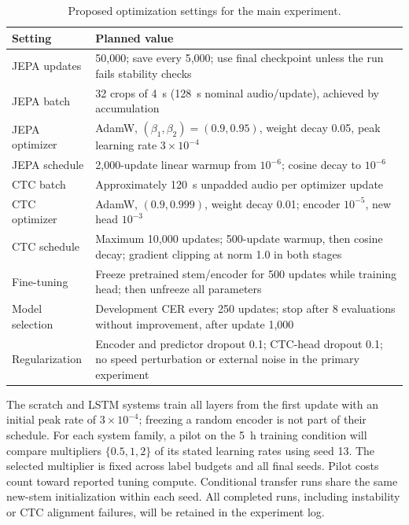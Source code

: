 \begin{table}[t]
\caption{Proposed optimization settings for the main experiment.}
\label{tab:settings}
\centering\footnotesize
\begin{tabularx}{\columnwidth}{@{}p{} X@{}}
\toprule
Setting & Planned value \\
\midrule
JEPA updates & 50,000; save every 5,000; use final checkpoint unless the run fails stability checks \\
JEPA batch & 32 crops of 4~s (128~s nominal audio/update), achieved by accumulation \\
JEPA optimizer & AdamW, $(\beta_1,\beta_2)=(0.9,0.95)$, weight decay 0.05, peak learning rate $3\times10^{-4}$ \\
JEPA schedule & 2,000-update linear warmup from $10^{-6}$; cosine decay to $10^{-6}$ \\
CTC batch & Approximately 120~s unpadded audio per optimizer update \\
CTC optimizer & AdamW, $(0.9,0.999)$, weight decay 0.01; encoder $10^{-5}$, new head $10^{-3}$ \\
CTC schedule & Maximum 10,000 updates; 500-update warmup, then cosine decay; gradient clipping at norm 1.0 in both stages \\
Fine-tuning & Freeze pretrained stem/encoder for 500 updates while training head; then unfreeze all parameters \\
Model selection & Development CER every 250 updates; stop after 8 evaluations without improvement, after update 1,000 \\
Regularization & Encoder and predictor dropout 0.1; CTC-head dropout 0.1; no speed perturbation or external noise in the primary experiment \\
\bottomrule
\end{tabularx}
\end{table}

The scratch and LSTM systems train all layers from the first update with an initial peak rate of $3\times10^{-4}$; freezing a random encoder is not part of their schedule. For each system family, a pilot on the 5~h training condition will compare multipliers $\{0.5,1,2\}$ of its stated learning rates using seed 13. The selected multiplier is fixed across label budgets and all final seeds. Pilot costs count toward reported tuning compute. Conditional transfer runs share the same new-stem initialization within each seed. All completed runs, including instability or CTC alignment failures, will be retained in the experiment log.

